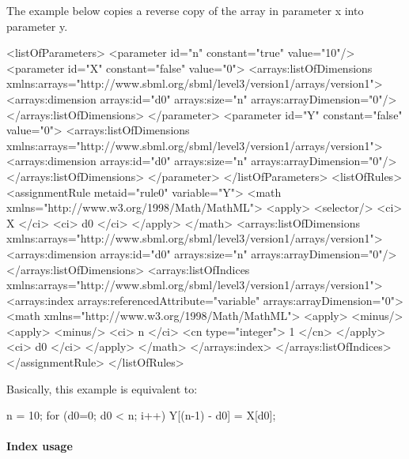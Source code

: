 The example below copies a reverse copy of the array in parameter x into parameter y.    

\begin{example}[showstringspaces=false]
<listOfParameters>
  <parameter id="n" constant="true" value="10"/>
  <parameter id="X" constant="false" value="0">
    <arrays:listOfDimensions xmlns:arrays="http://www.sbml.org/sbml/level3/version1/arrays/version1">
      <arrays:dimension arrays:id="d0" arrays:size="n" arrays:arrayDimension="0"/>
    </arrays:listOfDimensions>
  </parameter>
  <parameter id="Y" constant="false" value="0">
    <arrays:listOfDimensions xmlns:arrays="http://www.sbml.org/sbml/level3/version1/arrays/version1">
      <arrays:dimension arrays:id="d0" arrays:size="n" arrays:arrayDimension="0"/>
    </arrays:listOfDimensions>
  </parameter>
</listOfParameters>
<listOfRules>
  <assignmentRule metaid="rule0" variable="Y">
    <math xmlns="http://www.w3.org/1998/Math/MathML">
      <apply>
        <selector/>
        <ci> X </ci>
        <ci> d0 </ci>
      </apply>
    </math>
    <arrays:listOfDimensions xmlns:arrays="http://www.sbml.org/sbml/level3/version1/arrays/version1">
      <arrays:dimension arrays:id="d0" arrays:size="n" arrays:arrayDimension="0"/>
    </arrays:listOfDimensions>
    <arrays:listOfIndices xmlns:arrays="http://www.sbml.org/sbml/level3/version1/arrays/version1">
      <arrays:index arrays:referencedAttribute="variable" arrays:arrayDimension="0">
        <math xmlns="http://www.w3.org/1998/Math/MathML">
          <apply>
            <minus/>
            <apply>
              <minus/>
              <ci> n </ci>
              <cn type="integer"> 1 </cn>
            </apply>
            <ci> d0 </ci>
          </apply>
        </math>
      </arrays:index>
    </arrays:listOfIndices>
  </assignmentRule>
</listOfRules>
\end{example}

Basically, this example is equivalent to:

\begin{example}
n = 10;
for (d0=0; d0 < n; i++) {
  Y[(n-1) - d0] = X[d0];
}
\end{example}

\paragraph{Index usage}

